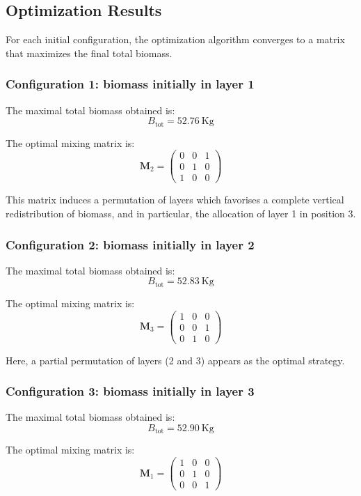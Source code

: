 \documentclass{article}
\begin{document}
\subsection{Optimization Results}

For each initial configuration, the optimization algorithm converges to a matrix
that maximizes the final total biomass.

\subsubsection{Configuration 1: biomass initially in layer 1}

The maximal total biomass obtained is:
\[
B_{\text{tot}} = 52.76 \ \mathrm{Kg}
\]

The optimal mixing matrix is:
\[
\mathbf{M}_2 =
\begin{pmatrix}
0 & 0 & 1 \\
0 & 1 & 0 \\
1 & 0 & 0
\end{pmatrix}
\]

This matrix induces a permutation of layers which favorises a complete vertical redistribution of biomass, and in particular, the allocation of layer 1 in position 3.

\subsubsection{Configuration 2: biomass initially in layer 2}

The maximal total biomass obtained is:
\[
B_{\text{tot}} = 52.83 \ \mathrm{Kg}
\]

The optimal mixing matrix is:
\[
\mathbf{M}_3 =
\begin{pmatrix}
1 & 0 & 0 \\
0 & 0 & 1 \\
0 & 1 & 0
\end{pmatrix}
\]

Here, a partial permutation of layers (2 and 3) appears as the optimal strategy.

\subsubsection{Configuration 3: biomass initially in layer 3}

The maximal total biomass obtained is:
\[
B_{\text{tot}} = 52.90 \ \mathrm{Kg}
\]

The optimal mixing matrix is:
\[
\mathbf{M}_1 =
\begin{pmatrix}
1 & 0 & 0 \\
0 & 1 & 0 \\
0 & 0 & 1
\end{pmatrix}
\]
\end{document}
